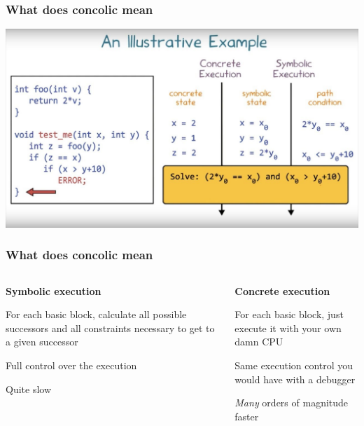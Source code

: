 \documentclass[aspectratio=169]{beamer}
\begin{document}
\begin{frame}[fragile]
	\frametitle{What does concolic mean}
	\begin{center}
	\end{center}
	\includegraphics[scale=0.25]{symbolic.jpg}
\end{frame}


\begin{frame}[fragile]
	\frametitle{What does concolic mean}
	\begin{columns}
	\begin{column}{0.48\textwidth}
		\begin{center}
		\textbf{\Large Symbolic execution} \\
		\end{center}
		For each basic block, calculate all possible successors and all constraints necessary to get to a given successor

		\vspace{1em}

		Full control over the execution

		\vspace{1em}
		\vspace{1em}

		Quite slow

	\end{column}
	\begin{column}{0.48\textwidth}
		\begin{center}
		\textbf{\Large Concrete execution} \\
		\end{center}
		For each basic block, just execute it with your own damn CPU 

		\vspace{1em}
		\vspace{1em}

		Same execution control you would have with a debugger
		\vspace{1em}

		\emph{Many} orders of magnitude faster
	\end{column}
	\end{columns}
\end{frame}
\end{document}
